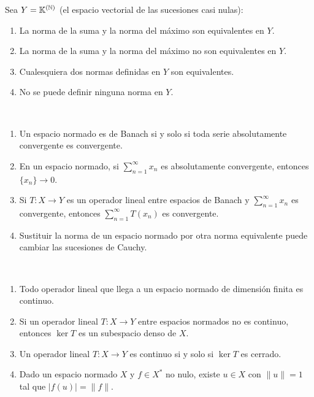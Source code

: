 \documentclass[12pt]{article}
\begin{document}
\begin{ejercicio}
    Sea $Y = \mathbb{K}^{(\mathbb{N})}$ (el espacio vectorial de las sucesiones casi nulas):
    \begin{enumerate}[label=(\alph*)]
        \item La norma de la suma y la norma del máximo son equivalentes en $Y$.
        \item La norma de la suma y la norma del máximo no son equivalentes en $Y$.
        \item Cualesquiera dos normas definidas en $Y$ son equivalentes.
        \item No se puede definir ninguna norma en $Y$.
    \end{enumerate}
\end{ejercicio}

\begin{ejercicio}~
    \begin{enumerate}[label=(\alph*)]
        \item Un espacio normado es de Banach si y solo si toda serie absolutamente convergente es convergente.
        \item En un espacio normado, si $\sum\limits_{n=1}^{\infty} x_n$ es absolutamente convergente, entonces $\{x_n\}\to 0$.
        \item Si $T: X \to Y$ es un operador lineal entre espacios de Banach y $\sum\limits_{n=1}^{\infty} x_n$ es convergente, entonces $\sum\limits_{n=1}^{\infty} T(x_n)$ es convergente.
        \item Sustituir la norma de un espacio normado por otra norma equivalente puede cambiar las sucesiones de Cauchy.
    \end{enumerate}    
\end{ejercicio}

\begin{ejercicio}~
    \begin{enumerate}[label=(\alph*)]
        \item Todo operador lineal que llega a un espacio normado de dimensión finita es continuo.
        \item Si un operador lineal $T: X \to Y$ entre espacios normados no es continuo, entonces $\ker T$ es un subespacio denso de $X$.
        \item Un operador lineal $T: X \to Y$ es continuo si y solo si $\ker T$ es cerrado.
        \item Dado un espacio normado $X$ y $f\in X^*$ no nulo, existe $u\in X$ con $\|u\|=1$ tal que $|f(u)|=\|f\|$.
    \end{enumerate}    
\end{ejercicio}
\end{document}
